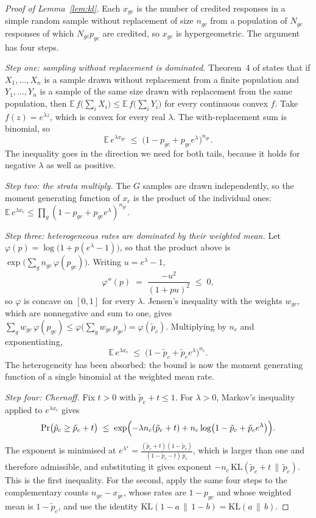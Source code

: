 \begin{proof}[Proof of Lemma~\ref{lem:kl}]
Each $x_{gc}$ is the number of credited responses in a simple random sample without
replacement of size $n_{gc}$ from a population of $N_{gc}$ responses of which $N_{gc}p_{gc}$
are credited, so $x_{gc}$ is hypergeometric. The argument has four steps.

\emph{Step one: sampling without replacement is dominated.} Theorem~4 of
\citet{hoeffding1963probability} states that if $X_1, \dots, X_n$ is a sample drawn without
replacement from a finite population and $Y_1, \dots, Y_n$ is a sample of the same size drawn
with replacement from the same population, then
$\mathbb{E}\, f\bigl(\sum_i X_i\bigr) \le \mathbb{E}\, f\bigl(\sum_i Y_i\bigr)$ for every
continuous convex $f$. Take $f(z) = e^{\lambda z}$, which is convex for every real $\lambda$.
The with-replacement sum is binomial, so
\[
\mathbb{E}\, e^{\lambda x_{gc}} \;\le\; \bigl(1 - p_{gc} + p_{gc} e^{\lambda}\bigr)^{n_{gc}} .
\]
The inequality goes in the direction we need for both tails, because it holds for negative
$\lambda$ as well as positive.

\emph{Step two: the strata multiply.} The $G$ samples are drawn independently, so the moment
generating function of $x_c$ is the product of the individual ones:
$\mathbb{E}\, e^{\lambda x_c} \le \prod_g (1 - p_{gc} + p_{gc}e^{\lambda})^{n_{gc}}$.

\emph{Step three: heterogeneous rates are dominated by their weighted mean.} Let
$\varphi(p) = \log\bigl(1 + p(e^{\lambda} - 1)\bigr)$, so that the product above is
$\exp\bigl(\sum_g n_{gc}\,\varphi(p_{gc})\bigr)$. Writing $u = e^{\lambda} - 1$,
\[
\varphi''(p) \;=\; \frac{-u^2}{(1 + pu)^2} \;\le\; 0 ,
\]
so $\varphi$ is concave on $[0,1]$ for every $\lambda$. Jensen's inequality with the weights
$w_{gc}$, which are nonnegative and sum to one, gives
$\sum_g w_{gc}\, \varphi(p_{gc}) \le \varphi\bigl(\sum_g w_{gc}\,p_{gc}\bigr) = \varphi(\tilde p_c)$.
Multiplying by $n_c$ and exponentiating,
\[
\mathbb{E}\, e^{\lambda x_c} \;\le\; \bigl(1 - \tilde p_c + \tilde p_c e^{\lambda}\bigr)^{n_c} .
\]
The heterogeneity has been absorbed: the bound is now the moment generating function of a
single binomial at the weighted mean rate.

\emph{Step four: Chernoff.} Fix $t > 0$ with $\tilde p_c + t \le 1$. For $\lambda > 0$,
Markov's inequality applied to $e^{\lambda x_c}$ gives
\[
\Pr\bigl(\hat p_c \ge \tilde p_c + t\bigr)
\;\le\; \exp\Bigl( -\lambda n_c (\tilde p_c + t) + n_c \log\bigl(1 - \tilde p_c + \tilde p_c e^{\lambda}\bigr) \Bigr) .
\]
The exponent is minimised at
$e^{\lambda^{\star}} = \frac{(\tilde p_c + t)(1 - \tilde p_c)}{(1 - \tilde p_c - t)\,\tilde p_c}$,
which is larger than one and therefore admissible, and substituting it gives exponent
$-n_c\,\mathrm{KL}(\tilde p_c + t \,\|\, \tilde p_c)$. This is the first inequality. For the
second, apply the same four steps to the complementary counts $n_{gc} - x_{gc}$, whose rates
are $1 - p_{gc}$ and whose weighted mean is $1 - \tilde p_c$, and use the identity
$\mathrm{KL}(1-a \,\|\, 1-b) = \mathrm{KL}(a \,\|\, b)$.
\end{proof}

